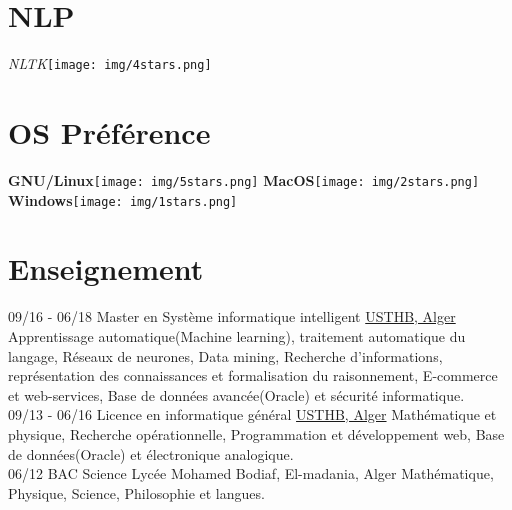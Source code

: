 \documentclass[]{friggeri-cv}
\begin{document}
\begin{aside}
  \section{NLP}
    \emph{NLTK}\texttt{[image: img/4stars.png]}    
    ~
    ~
  \section{OS Préférence}
    \textbf{GNU/Linux}\texttt{[image: img/5stars.png]}
    \textbf{MacOS}\texttt{[image: img/2stars.png]}
    \textbf{Windows}\texttt{[image: img/1stars.png]}
\end{aside}
\vspace{0.42cm}
\section{Enseignement}
\begin{entrylist}
  \entry
    {09/16 - 06/18}
    {Master en  Système informatique intelligent}
    {\href{http://www.usthb.dz/IMG/pdf/Master-SII.pdf}{USTHB, Alger}}
    {Apprentissage automatique(Machine learning), traitement automatique du langage, Réseaux de neurones, Data mining, Recherche d'informations, représentation des connaissances et formalisation du raisonnement,  E-commerce et web-services, Base de données avancée(Oracle) et sécurité informatique.\\}
  \entry
    {09/13 - 06/16}
    {Licence en informatique général}
    {\href{http://www.usthb.dz/spip.php?article47}{USTHB, Alger}}
    {Mathématique et physique, Recherche opérationnelle, Programmation et développement web,  Base de données(Oracle) et électronique analogique.\\}
  \entry
    {06/12}
    {BAC Science}
    {Lycée Mohamed Bodiaf, El-madania, Alger}
    {Mathématique, Physique, Science, Philosophie et langues.}
\end{entrylist}

\vspace{0.5cm}
\end{document}
